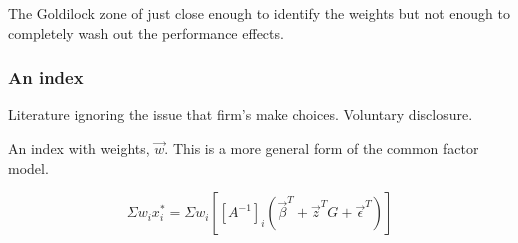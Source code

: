 \documentclass[]{article} %
\begin{document}
The Goldilock zone of just close enough to identify the weights but not enough to completely wash out the performance effects.

\subsubsection{An index}

Literature ignoring the issue that firm's make choices. Voluntary disclosure.

An index with weights, $\vec{w}$. This is a more general form of the common factor model.

\begin{equation}
\label{eq:index}
    \Sigma w_i x^*_i = 
    \Sigma w_i [[A^{-1}]_i (\vec{\beta}^T + \vec{z}^T G + \vec{\epsilon}^T)]
\end{equation}
\end{document}
